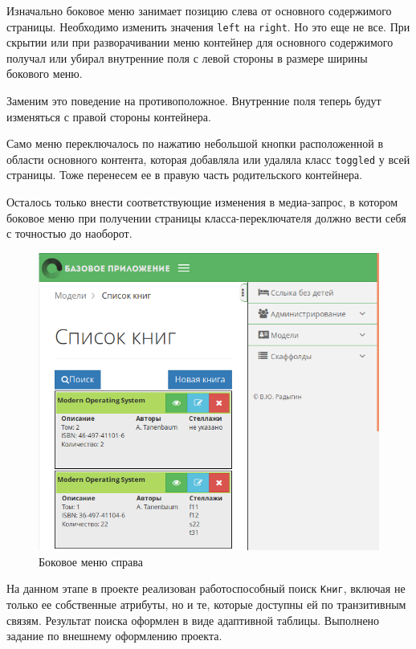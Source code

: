 Изначально боковое меню занимает позицию слева от
основного содержимого страницы. Необходимо изменить значения
\texttt{left} на \texttt{right}. Но это еще не все.
При скрытии или при разворачивании меню контейнер для основного содержимого
получал или убирал внутренние поля с левой стороны
в размере ширины бокового меню.

Заменим это поведение на противоположное. Внутренние поля теперь
будут изменяться с правой стороны контейнера.

Само меню переключалось по нажатию небольшой кнопки расположенной
в области основного контента, которая добавляла или удаляла
класс \texttt{toggled} у всей страницы. Тоже перенесем ее
в правую часть родительского контейнера.

Осталось только внести соответствующие изменения в медиа-запрос,
в котором боковое меню при получении страницы класса-переключателя
должно вести себя с точностью до наоборот.

\begin{figure}[ht!]
\begin{center}
\includegraphics[scale=0.75]{images/sidebar.png}
\end{center}
\vspace*{-8mm}
\caption{Боковое меню справа} \label{fig:sidebar}
\end{figure}

На данном этапе в проекте реализован работоспособный поиск
\verb|Книг|, включая не только ее собственные атрибуты, но и те, которые
доступны ей по транзитивным связям. Результат поиска
оформлен в виде адаптивной таблицы. Выполнено задание по внешнему оформлению
проекта.
